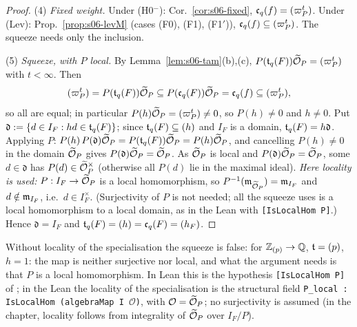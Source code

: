 \begin{proof}
(4) \emph{Fixed weight.} Under (H0$^-$): Cor.~\ref{cor:s06-fixed}, $\mathfrak{c}_q(f)=(\varpi_P^t)$. Under (Lev):
Prop.~\ref{prop:s06-levM} (cases (F0), (F1), (F1$'$)), $\mathfrak{c}_q(f)\subseteq(\varpi_P^t)$. The squeeze needs only the inclusion.


(5) \emph{Squeeze, with $P$ local.} By Lemma~\ref{lem:s06-tam}(b),(c), $P(\mathfrak{t}_q(F))\widetilde{\mathcal{O}}_P=(\varpi_P^t)$ with $t<\infty$. Then
\[(\varpi_P^t)=P(\mathfrak{t}_q(F))\widetilde{\mathcal{O}}_P\subseteq P(\mathfrak{c}_q(F))\widetilde{\mathcal{O}}_P=\mathfrak{c}_q(f)\subseteq(\varpi_P^t),\]
so all are equal; in particular $P(h)\widetilde{\mathcal{O}}_P=(\varpi_P^t)\ne0$, so $P(h)\ne0$ and $h\ne0$.
Put $\mathfrak d:=\{d\in I_F:hd\in\mathfrak{t}_q(F)\}$; since $\mathfrak{t}_q(F)\subseteq(h)$ and $I_F$ is a domain, $\mathfrak{t}_q(F)=h\mathfrak d$. Applying $P$:
$P(h)\,P(\mathfrak d)\widetilde{\mathcal{O}}_P=P(\mathfrak{t}_q(F))\widetilde{\mathcal{O}}_P=P(h)\widetilde{\mathcal{O}}_P$, and cancelling $P(h)\ne0$ in the domain $\widetilde{\mathcal{O}}_P$ gives $P(\mathfrak d)\widetilde{\mathcal{O}}_P=\widetilde{\mathcal{O}}_P$. As
$\widetilde{\mathcal{O}}_P$ is local and $P(\mathfrak d)\widetilde{\mathcal{O}}_P=\widetilde{\mathcal{O}}_P$, some $d\in\mathfrak d$ has $P(d)\in\widetilde{\mathcal{O}}_P^\times$ (otherwise all $P(d)$ lie in the maximal ideal).
\emph{Here locality is used:} $P:I_F\to\widetilde{\mathcal{O}}_P$ is a local homomorphism, so $P^{-1}(\mathfrak{m}_{\widetilde{\mathcal{O}}_P})=\mathfrak{m}_{I_F}$ and $d\notin\mathfrak{m}_{I_F}$, i.e.\ $d\in I_F^\times$. (Surjectivity of $P$ is not needed; all the squeeze uses is a local homomorphism to a local domain, as in the Lean  with \texttt{[IsLocalHom P]}.)
Hence $\mathfrak d=I_F$ and $\mathfrak{t}_q(F)=(h)=\mathfrak{c}_q(F)=(h_F)$.
\end{proof}
\noindent Without locality of the specialisation the squeeze is false: for $\mathbb{Z}_{(p)}\to\mathbb{Q}$, $\mathfrak{t}=(p)$, $h=1$: the map is neither surjective nor local, and what the argument needs is that $P$ is a local homomorphism. In Lean this is the hypothesis \texttt{[IsLocalHom P]} of ; in the Lean  the locality of the specialisation is the structural field \texttt{P\_local : IsLocalHom (algebraMap I \ensuremath{\mathcal O})}, with $\mathcal O=\widetilde{\mathcal{O}}_P$; no surjectivity is assumed (in the chapter, locality follows from integrality of $\widetilde{\mathcal{O}}_P$ over $I_F/P$).

